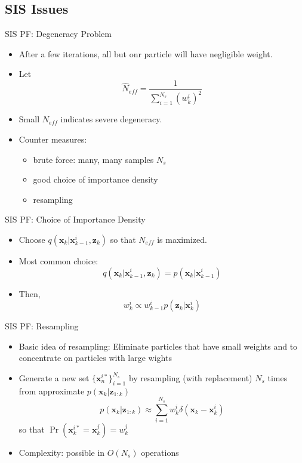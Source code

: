 \documentclass{beamer}
\newcommand{\x}{\mathbf{x}}
\newcommand{\z}{\mathbf{z}}
\begin{document}
\subsection{SIS Issues}
\begin{frame}{SIS PF: Degeneracy Problem}%
	\begin{itemize}
		\item{After a few iterations, all but onr particle will have negligible weight.
		}
		\item{Let
			$$
  	  			\hat{N}_{eff}=\frac{1}{\sum\limits_{i=1}^{N_s}(w_k^i)^2}
			$$
		}
		\item{Small $N_{eff}$ indicates severe degeneracy.
		}
		\item Counter measures:
		\begin{itemize}
    		\item brute force: many, many samples $N_s$
    		\item good choice of importance density
    		\item resampling
		\end{itemize}
	\end{itemize}
\end{frame}

\begin{frame}{SIS PF: Choice of Importance Density}%
	\begin{itemize}
		\item{Choose $q(\x_k|\x_{k-1}^i, \z_k)$ so that $N_{eff}$ is maximized.
		}
		\item{Most common choice:
			$$
    q(\x_k|\x_{k-1}^{i},\z_k) = p(\x_k|\x_{k-1}^i)
			$$
		}
		\item{Then,
			$$
 			   w^i_k \propto w^i_{k-1} p(\z_k|\x_k^i)
			$$
		}
	\end{itemize}
\end{frame}

\begin{frame}{SIS PF: Resampling}%
	\begin{itemize}
		\item{Basic idea of resampling: Eliminate particles that have small weights and to concentrate on particles with large wights
		}
		\item{Generate a new set $\{\x_n^{i*}\}_{i=1}^{N_s}$ by resampling (with replacement) $N_s$ times from approximate $p(\x_k|\z_{1:k})$
		$$
			p(\x_k|\z_{1:k}) \approx \sum_{i=1}^{N_s} w_k^i \delta(\x_k - \x_k^i)
		$$
so that $\Pr(\x_k^{i*}=\x_k^j)=w_k^j$		
		}
		\item{Complexity: possible in $O(N_s)$ operations 
		}
	\end{itemize}
\end{frame}
\end{document}
